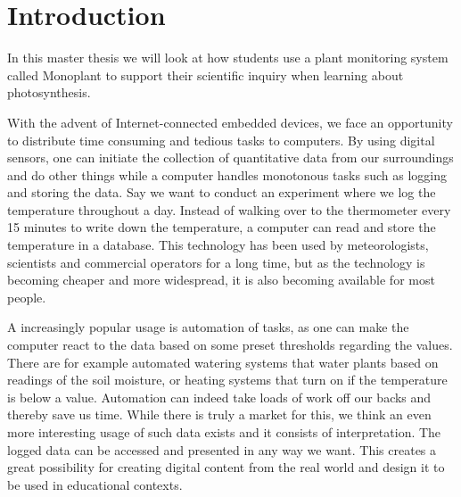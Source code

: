 \setcounter{page}{1}
\chapter{Introduction}
In this master thesis we will look at how students use a plant monitoring system called Monoplant to support their scientific inquiry when learning about photosynthesis. 


With the advent of Internet-connected embedded devices, we face an opportunity to distribute time consuming and tedious tasks to computers. By using digital sensors, one can initiate the collection of quantitative data from our surroundings and do other things while a computer handles monotonous tasks such as logging and storing the data. Say we want to conduct an experiment where we log the temperature throughout a day. Instead of walking over to the thermometer every 15 minutes to write down the temperature, a computer can read and store the temperature in a database. This technology has been used by meteorologists, scientists and commercial operators for a long time, but as the technology is becoming cheaper and more widespread, it is also becoming available for most people. %

A increasingly popular usage is automation of tasks, as one can make the computer react to the data based on some preset thresholds regarding the values. There are for example automated watering systems that water plants based on readings of the soil moisture, or heating systems that turn on if the temperature is below a value. Automation can indeed take loads of work off our backs and thereby save us time. While there is truly a market for this, we think an even more interesting usage of such data exists and it consists of interpretation. The logged data can be accessed and presented in any way we want. This creates a great possibility for creating digital content from the real world and design it to be used in educational contexts.



